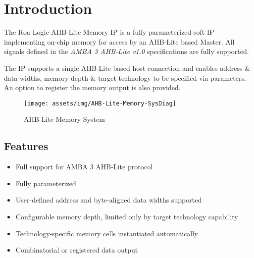 \chapter{Introduction}\label{introduction}

The Roa Logic AHB-Lite Memory IP is a fully parameterized soft IP
implementing on-chip memory for access by an AHB-Lite based Master. 
All signals defined in the \emph{AMBA 3 AHB-Lite v1.0} specifications are
fully supported.

The IP supports a single AHB-Lite based host connection and enables
address \& data widths, memory depth \& target technology to be
specified via parameters. An option to register the memory output is
also provided.

\begin{figure}[th]
	\centering
	\texttt{[image: assets/img/AHB-Lite-Memory-SysDiag]}
	\caption{AHB-Lite Memory System}
	\label{fig:ahb-lite-memory-sysdiag}
\end{figure}

\section{Features}\label{features}

\begin{itemize}
\item
  Full support for AMBA 3 AHB-Lite protocol
\item
  Fully parameterized
\item
  User-defined address and byte-aligned data widths supported
\item
  Configurable memory depth, limited only by target technology
  capability
\item
  Technology-specific memory cells instantiated automatically
\item
  Combinatorial or registered data output
\end{itemize}
